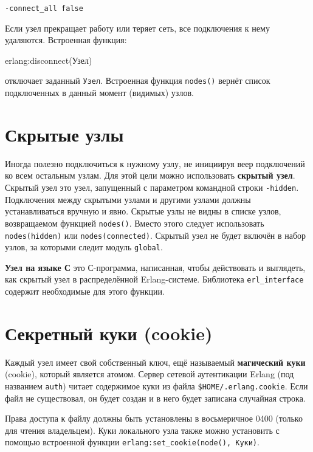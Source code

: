 \qquad\texttt{-connect\_all false}

Если узел прекращает работу или теряет сеть, все подключения к нему удаляются.
Встроенная функция:

\begin{erlangru}
erlang:disconnect(Узел)
\end{erlangru}

отключает заданный \texttt{Узел}. Встроенная функция \texttt{nodes()} вернёт 
список подключенных в данный момент (видимых) узлов.


\section{Скрытые узлы}

Иногда полезно подключиться к нужному узлу, не инициируя веер подключений ко 
всем остальным узлам.  Для этой цели можно использовать \textbf{скрытый узел}. 
Скрытый узел это узел, запущенный с параметром командной строки 
\texttt{-hidden}. Подключения между скрытыми узлами и другими узлами должны 
устанавливаться вручную и явно.  Скрытые узлы не видны в списке узлов, 
возвращаемом функцией  \texttt{nodes()}.  Вместо этого следует использовать 
\texttt{nodes(hidden)} или \texttt{nodes(connected)}.  Скрытый узел не будет 
включён в набор узлов, за которыми следит модуль \texttt{global}.

\textbf{Узел на языке С} это С-программа, написанная, чтобы действовать и 
выглядеть, как скрытый узел в распределённой Erlang-системе.  Библиотека 
\texttt{erl\_interface} содержит необходимые для этого функции.


\section{Секретный куки (cookie)}

Каждый узел имеет свой собственный ключ, ещё называемый 
\textbf{магический куки} (cookie), который является атомом. Сервер сетевой
аутентикации Erlang (под названием \texttt{auth}) читает содержимое куки из
файла \texttt{\$HOME/.erlang.cookie}.  Если файл не существовал, он будет
создан и в него будет записана случайная строка.


Права доступа к файлу должны быть установлены в восьмеричное 0400 (только для
чтения владельцем).  Куки локального узла также можно установить с помощью 
встроенной функции \texttt{erlang:set\_cookie(node(), Куки)}.

